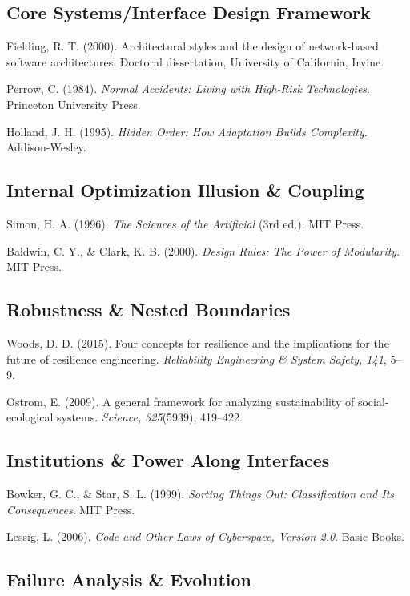 \documentclass[
  openright]{book}
\begin{document}
\subsection{Core Systems/Interface Design
Framework}\label{core-systemsinterface-design-framework}

Fielding, R. T. (2000). Architectural styles and the design of
network-based software architectures. Doctoral dissertation, University
of California, Irvine.

Perrow, C. (1984). \emph{Normal Accidents: Living with High-Risk
Technologies}. Princeton University Press.

Holland, J. H. (1995). \emph{Hidden Order: How Adaptation Builds
Complexity}. Addison-Wesley.

\subsection{Internal Optimization Illusion \&
Coupling}\label{internal-optimization-illusion-coupling}

Simon, H. A. (1996). \emph{The Sciences of the Artificial} (3rd ed.).
MIT Press.

Baldwin, C. Y., \& Clark, K. B. (2000). \emph{Design Rules: The Power of
Modularity}. MIT Press.

\subsection{Robustness \& Nested
Boundaries}\label{robustness-nested-boundaries}

Woods, D. D. (2015). Four concepts for resilience and the implications
for the future of resilience engineering. \emph{Reliability Engineering
\& System Safety, 141}, 5--9.

Ostrom, E. (2009). A general framework for analyzing sustainability of
social-ecological systems. \emph{Science, 325}(5939), 419--422.

\subsection{Institutions \& Power Along
Interfaces}\label{institutions-power-along-interfaces}

Bowker, G. C., \& Star, S. L. (1999). \emph{Sorting Things Out:
Classification and Its Consequences}. MIT Press.

Lessig, L. (2006). \emph{Code and Other Laws of Cyberspace, Version
2.0}. Basic Books.

\subsection{Failure Analysis \&
Evolution}\label{failure-analysis-evolution}
\end{document}
